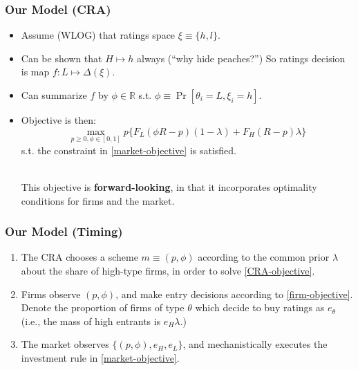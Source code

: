 \documentclass{beamer}
\begin{document}
\begin{frame}
    \frametitle{Our Model (CRA)}
    \begin{itemize}[<+>]
        \item Assume (WLOG) that ratings space $\xi \equiv \{h, l\}$. 
        \item Can be shown that $H \mapsto h$ always (``why hide peaches?'') So ratings decision is map $f: L \mapsto \Delta(\xi)$.
        \item Can summarize $f$ by $\phi \in \mathbb{R}$ s.t. $\phi \equiv \Pr[\theta_i = L, \xi_i = h]$.
        \item Objective is then: 
        \begin{equation}
            \max\limits_{p \geq 0, \phi \in [0, 1]} p \{F_L(\phi R - p)(1 - \lambda) + F_H(R - p)\lambda\}
            \label{CRA-objective}    
        \end{equation} s.t. the constraint in \eqref{market-objective} is satisfied. 
        
        \hspace{1 em} \\ 

        This objective is \textbf{forward-looking}, in that it incorporates optimality conditions for firms and the market. 
    \end{itemize} 
\end{frame}

\begin{frame}
    \frametitle{Our Model (Timing)}
    \begin{enumerate}[<+>]
        \item The CRA chooses a scheme $m \equiv (p, \phi)$ according to the common prior $\lambda$ about the share of high-type firms, in order to solve \eqref{CRA-objective}.
    
        \item Firms observe $(p, \phi)$, and make entry decisions according to \eqref{firm-objective}. Denote the proportion of firms of type $\theta$ which decide to buy ratings as $e_\theta$ (i.e., the mass of high entrants is $e_H \lambda$.)
        
        \item The market observes $\{(p, \phi), e_H, e_L\}$, and mechanistically executes the investment rule in \eqref{market-objective}.    
    \end{enumerate}
\end{frame}
\end{document}
